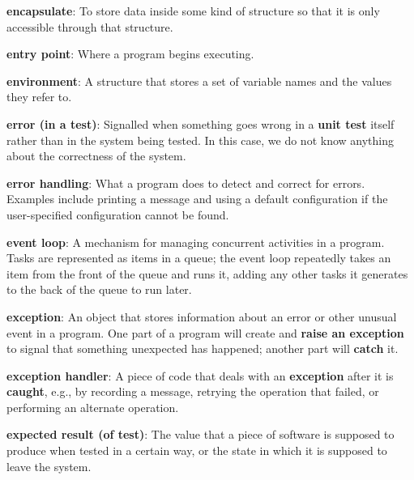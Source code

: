 \documentclass[krantzl]{krantz}
\newcommand{\glosskey}[1]{\textbf{#1}}
\begin{document}
\noindent \textbf{{\newline}\glosskey{encapsulate}}: 
To store data inside some kind of structure so that it is only accessible through that structure.


\noindent \textbf{{\newline}\glosskey{entry point}}: 
Where a program begins executing.


\noindent \textbf{{\newline}\glosskey{environment}}: 
A structure that stores a set of variable names and the values they refer to.


\noindent \textbf{{\newline}\glosskey{error (in a test)}}: 
Signalled when something goes wrong in a \glosskey{unit test} itself rather than in the system being tested. In this case, we do not know anything about the correctness of the system.


\noindent \textbf{{\newline}\glosskey{error handling}}: 
What a program does to detect and correct for errors. Examples include printing a message and using a default configuration if the user-specified configuration cannot be found.


\noindent \textbf{{\newline}\glosskey{event loop}}: 
A mechanism for managing concurrent activities in a program. Tasks are represented as items in a queue; the event loop repeatedly takes an item from the front of the queue and runs it, adding any other tasks it generates to the back of the queue to run later.


\noindent \textbf{{\newline}\glosskey{exception}}: 
An object that stores information about an error or other unusual event in a program. One part of a program will create and \glosskey{raise an exception} to signal that something unexpected has happened; another part will \glosskey{catch} it.


\noindent \textbf{{\newline}\glosskey{exception handler}}: 
A piece of code that deals with an \glosskey{exception} after it is \glosskey{caught}, e.g., by recording a message, retrying the operation that failed, or performing an alternate operation.


\noindent \textbf{{\newline}\glosskey{expected result (of test)}}: 
The value that a piece of software is supposed to produce when tested in a certain way, or the state in which it is supposed to leave the system.
\end{document}

